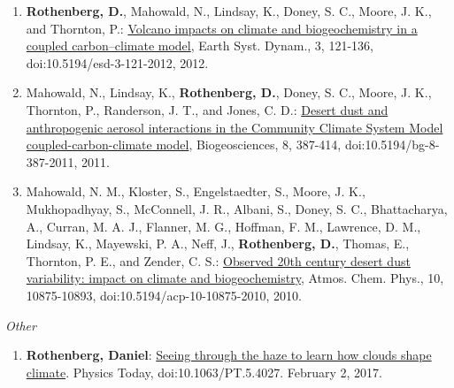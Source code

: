 \documentclass[11pt,letterpaper]{article}
\begin{document}
\begin{enumerate}[itemindent=-10pt]
 \item \textbf{Rothenberg, D.}, Mahowald, N., Lindsay, K., Doney, S. C., Moore, J. K., and Thornton, P.: \href{http://dx.doi.org/10.5194/esd-3-121-2012}{Volcano impacts on climate and biogeochemistry in a coupled carbon–climate model}, Earth Syst. Dynam., 3, 121-136, doi:10.5194/esd-3-121-2012, 2012.

 \item Mahowald, N., Lindsay, K., \textbf{Rothenberg, D.}, Doney, S. C., Moore, J. K., Thornton, P., Randerson, J. T., and Jones, C. D.: \href{http://dx.doi.org/10.5194/bg-8-387-2011}{Desert dust and anthropogenic aerosol interactions in the Community Climate System Model coupled-carbon-climate model}, Biogeosciences, 8, 387-414, doi:10.5194/bg-8-387-2011, 2011.

 \item Mahowald, N. M., Kloster, S., Engelstaedter, S., Moore, J. K., Mukhopadhyay, S., McConnell, J. R., Albani, S., Doney, S. C., Bhattacharya, A., Curran, M. A. J., Flanner, M. G., Hoffman, F. M., Lawrence, D. M., Lindsay, K., Mayewski, P. A., Neff, J., \textbf{Rothenberg, D.}, Thomas, E., Thornton, P. E., and Zender, C. S.: \href{http://dx.doi.org/10.5194/acp-10-10875-2010}{Observed 20th century desert dust variability: impact on climate and biogeochemistry}, Atmos. Chem. Phys., 10, 10875-10893, doi:10.5194/acp-10-10875-2010, 2010.
\end{enumerate}

\bigskip
\emph{Other}
\medskip
\begin{enumerate}[itemindent=-10pt]

\item \textbf{Rothenberg, Daniel}: \href{http://physicstoday.scitation.org/do/10.1063/PT.5.4027/full/}{Seeing through the haze to learn how clouds shape climate}. Physics Today, doi:10.1063/PT.5.4027. February 2, 2017.

\end{enumerate}
\end{document}
